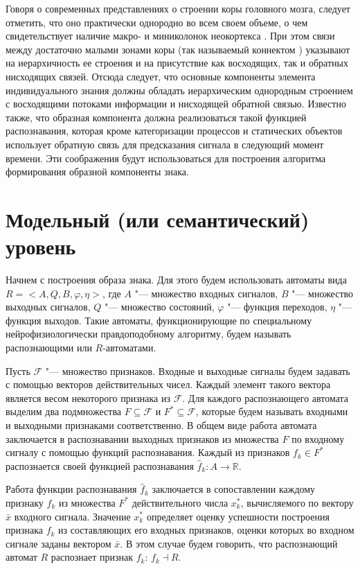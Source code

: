 \documentclass[a4paper, 12pt]{article}
\theoremstyle{break}
\numberwithin{equation}{section}
\begin{document}
	Говоря о современных представлениях о строении коры головного мозга, следует отметить, что оно практически однородно во всем своем объеме, о чем свидетельствует наличие макро- и миниколонок неокортекса \cite{Mountcastle1998,Rockland2010}. При этом связи между достаточно малыми зонами коры (так называемый коннектом \cite{Zador2012}) указывают на иерархичность ее строения и на присутствие как восходящих, так и обратных нисходящих связей. Отсюда следует, что основные компоненты элемента индивидуального знания должны обладать иерархическим однородным строением с восходящими потоками информации и нисходящей обратной связью. Известно также, что образная компонента должна реализоваться такой функцией распознавания, которая кроме категоризации процессов и статических объектов использует обратную связь для предсказания сигнала в следующий момент времени. Эти соображения будут использоваться для построения алгоритма формирования образной компоненты знака.
	
	\section{Модельный (или семантический) уровень}\label{sect:seman}
	Начнем с построения образа знака. Для этого будем использовать автоматы вида  $R=<A,Q,B,\varphi, \eta>$, где $A$ "--- множество входных сигналов, $B$ "--- множество выходных сигналов, $Q$ "--- множество состояний, $\varphi$ "--- функция переходов, $\eta$ "--- функция выходов. Такие автоматы, функционирующие по специальному нейрофизиологически правдоподобному алгоритму, будем называть распознающими или $R$-автоматами. 
	
	Пусть $\mathcal F$ "--- множество признаков. Входные и выходные сигналы будем задавать с помощью  векторов действительных чисел. Каждый элемент такого вектора является весом некоторого признака из $\mathcal F$. Для каждого распознающего автомата выделим два подмножества $F\subseteq\mathcal F$ и $F^*\subseteq\mathcal F$, которые будем называть входными и выходными признаками соответственно. В общем виде работа автомата заключается в распознавании выходных признаков из множества $F$ по входному сигналу с помощью функций распознавания. Каждый из признаков $f_k\in F^*$ распознается своей функцией распознавания $\hat f_k: A\rightarrow \mathbb R$.
	
	Работа функции распознавания $\hat f_k$ заключается в сопоставлении каждому признаку $f_k$ из множества $F^*$ действительного числа $x_k^*$, вычисляемого по вектору $\bar x$ входного сигнала. Значение $x_k^*$ определяет оценку успешности построения признака $f_k$ из составляющих его входных признаков, оценки которых во входном сигнале заданы вектором $\bar x$. В этом случае будем говорить, что распознающий автомат $R$ распознает признак $f_k$: $f_k\dashv R$.
	
\end{document}
